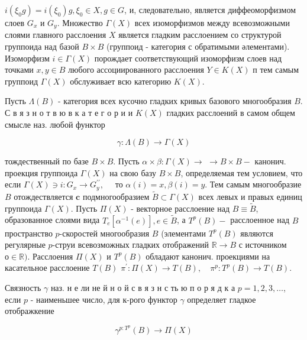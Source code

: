 \documentclass[10pt]{article}
\begin{document}
$i\left(\xi_{0} g\right)=i\left(\xi_{0}\right) g, \xi_{0} \in X, g \in G$, и, следовательно, является диффеоморфизмом слоев $G_{x}$ и $G_{y}$. Множество $\Gamma(X)$ всех изоморфизмов между всевозможными слоями главного расслоения $X$ является гладким расслоением со структурой группоида над базой $B \times B$ (группоид - категория с обратимыми әлементами). Изоморфизм $i \in \Gamma(X)$ порождает соответствующий изоморфизм слоев над точками $x, y \in B$ любого ассоциированного расслоения $Y \in K(X)$ п тем самым группоид $\Gamma(X)$ обслуживает всю категорию $K(X)$.



Пусть $\Lambda(B)$ - категория всех кусочно гладких кривых базового многообразия $B$. С в я з н о т в ю в к а т е г о р и и $K(X)$ гладких расслоений в самом общем смысле наз. любой функтор



\[

\gamma: \Lambda(B) \rightarrow \Gamma(X)

\]



тождественный по базе $B \times B$. Пусть $\alpha \times \beta: \Gamma(X) \rightarrow$ $\rightarrow B \times B-$ канонич. проекция группоида $\Gamma(X)$ на свою базу $B \times B$, определяемая тем условием, что если $\Gamma(X) \ni i: G_{x} \rightarrow G_{y}^{\prime \prime}, \quad$ то $\alpha(i)=x, \beta(i)=y$. Тем самым многообразие $B$ отождествляется $\boldsymbol{c}$ подмногообразием $\tilde{B} \subset \Gamma(X)$ всех левых и правых единиц группоида $\Gamma(X)$. Пусть $\Pi(X)$ - векторное расслоение над $B \equiv \widetilde{B}$, образованное слоями вида $T_{e}\left[\alpha^{-1}(e)\right], e \in \tilde{B}$, а $T^{p}(B)-$ расслоенное над $B$ пространство $p$-скоростей многообразия $B$ (элементами $T^{p}(B)$ являются регулярные $p$-струи всевозможных гладких отображений $\mathbb{R} \rightarrow B$ с источником $о \in \mathbb{R})$. Расслоения $\Pi(X)$ и $T^{p}(B)$ обладают канонич. проекциями на касательное расслоение $T(B)$ $\pi^{\prime}: \Pi(X) \longrightarrow T(B), \quad \pi^{p}: T^{p}(B) \longrightarrow T(B)$.



Связность $\gamma$ наз. н е ли не й н о й с в я з н с ть ю п о р я д к а $p=1,2,3, \ldots$, если $p$ - наименьшее число, для к-рого функтор $\gamma$ определяет гладкое отображкение



\[

\gamma^{p: T^{p}}(B) \rightarrow \Pi(X)

\]
\end{document}
